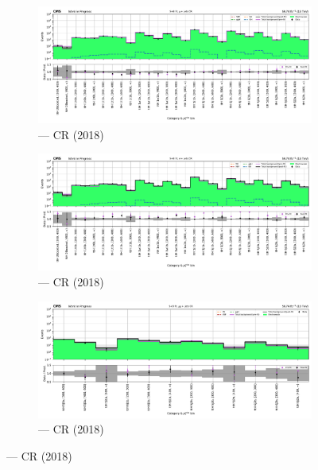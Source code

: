 \begin{figure}[htbp]
    \centering
    \begin{subfigure}[b]{0.65\textwidth}
        \includegraphics[width=\textwidth]{chapters/higgstoinv/figures/mountain_ranges/2018/ttH/Wmunu_tree_fit_s-abs_values_ttH_cats.pdf}
        \caption{\ttH --- \singleMuCr \gls{CR} (2018)}
    \end{subfigure}

    \begin{subfigure}[b]{0.65\textwidth}
        \includegraphics[width=\textwidth]{chapters/higgstoinv/figures/mountain_ranges/2018/ttH/Wenu_tree_fit_s-abs_values_ttH_cats.pdf}
        \caption{\ttH --- \singleEleCr \gls{CR} (2018)}
    \end{subfigure}

    \begin{subfigure}[b]{0.65\textwidth}
        \includegraphics[width=\textwidth]{chapters/higgstoinv/figures/mountain_ranges/2018/ttH/Zmumu_tree_fit_s-abs_values_ttH_cats.pdf}
        \caption{\ttH --- \doubleMuCr \gls{CR} (2018)}
    \end{subfigure}


\end{figure}
